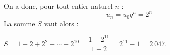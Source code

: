 \begin{corrige}
\begin{itemize}
          \par
          On a donc, pour tout entier naturel $n$ :
          \[ u_n=u_0q^n=2^n \]
          La somme $S$ vaut alors :
          \par
          $S=1+2+2^2+\cdots+2^{10}=\dfrac{1-2^{11}}{1-2}$\nosp$=2^{11}-1=2\ 047$.
     \end{itemize}
\end{corrige}
